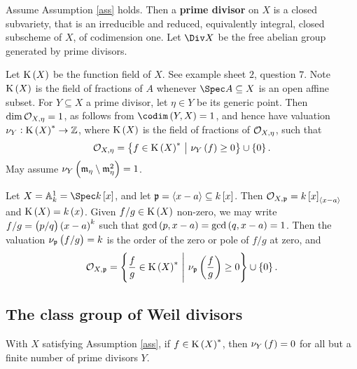 \begin{definition*}
Assume Assumption \ref{ass} holds. Then a \textbf{prime divisor} on $ X $ is a closed subvariety, that is an irreducible and reduced, equivalently integral, closed subscheme of $ X $, of codimension one. Let $ \Div X $ be the free abelian group generated by prime divisors.
\end{definition*}

Let $ \K\br{X} $ be the function field of $ X $. See example sheet $ 2 $, question $ 7 $. Note $ \K\br{X} $ is the field of fractions of $ A $ whenever $ \Spec A \subseteq X $ is an open affine subset. For $ Y \subseteq X $ a prime divisor, let $ \eta \in Y $ be its generic point. Then $ \dim \mathcal{O}_{X, \eta} = 1 $, as follows from $ \codim\br{Y, X} = 1 $, and hence have valuation $ \nu_Y : \K\br{X}^* \to \ZZ $, where $ \K\br{X} $ is the field of fractions of $ \mathcal{O}_{X, \eta} $, such that
$$ \OOO_{X, \eta} = \cbr{f \in \K\br{X}^* \st \nu_Y\br{f} \ge 0} \cup \cbr{0}. $$
May assume $ \nu_Y\br{\mmm_\eta \setminus \mmm_\eta^2} = 1 $.

\begin{example*}
Let $ X = \AA_k^1 = \Spec k\sbr{x} $, and let $ \ppp = \abr{x - a} \subseteq k\sbr{x} $. Then $ \OOO_{X, \ppp} = k\sbr{x}_{\abr{x - a}} $ and $ \K\br{X} = k\br{x} $. Given $ f / g \in \K\br{X} $ non-zero, we may write $ f / g = \br{p / q}\br{x - a}^k $ such that $ \gcd\br{p, x - a} = \gcd\br{q, x - a} = 1 $. Then the valuation $ \nu_\ppp\br{f / g} = k $ is the order of the zero or pole of $ f / g $ at zero, and
$$ \OOO_{X, \ppp} = \cbr{\dfrac{f}{g} \in \K\br{X}^* \st \nu_\ppp\br{\dfrac{f}{g}} \ge 0} \cup \cbr{0}. $$
\end{example*}

\pagebreak

\subsection{The class group of Weil divisors}

\begin{lemma}
\label{lem:primedivisor}
With $ X $ satisfying Assumption \ref{ass}, if $ f \in \K\br{X}^* $, then $ \nu_Y\br{f} = 0 $ for all but a finite number of prime divisors $ Y $.
\end{lemma}

